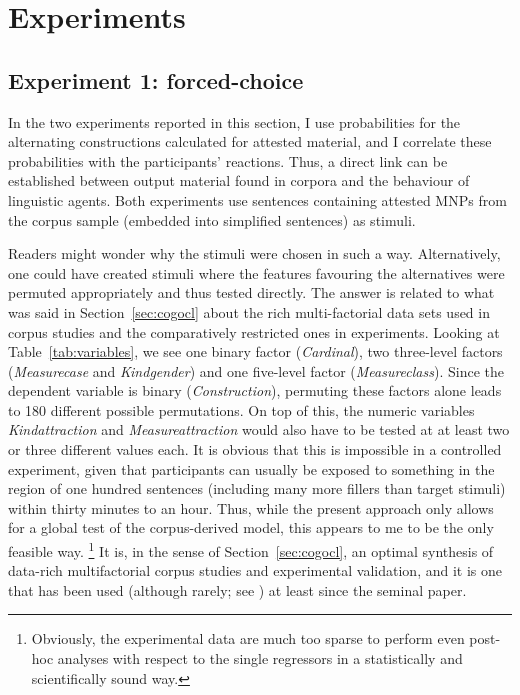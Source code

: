 \section{Experiments}
\label{sec:experimental}

\subsection{Experiment 1: forced-choice}
\label{sec:exp:fc}

In the two experiments reported in this section, I use probabilities for the alternating constructions calculated for attested material, and I correlate these probabilities with the participants' reactions.
Thus, a direct link can be established between output material found in corpora and the behaviour of linguistic agents.
Both experiments use sentences containing attested MNPs from the corpus sample (embedded into simplified sentences) as stimuli.

Readers might wonder why the stimuli were chosen in such a way.
Alternatively, one could have created stimuli where the features favouring the alternatives were permuted appropriately and thus tested directly.
The answer is related to what was said in Section~\ref{sec:cogocl} about the rich multi-factorial data sets used in corpus studies and the comparatively restricted ones in experiments.
Looking at Table~\ref{tab:variables}, we see one binary factor (\textit{Cardinal}), two three-level factors (\textit{Measurecase} and \textit{Kindgender}) and one five-level factor (\textit{Measureclass}).
Since the dependent variable is binary (\textit{Construction}), permuting these factors alone leads to 180 different possible permutations.
On top of this, the numeric variables \textit{Kindattraction} and \textit{Measureattraction} would also have to be tested at at least two or three different values each.
It is obvious that this is impossible in a controlled experiment, given that participants can usually be exposed to something in the region of one hundred sentences (including many more fillers than target stimuli) within thirty minutes to an hour.
Thus, while the present approach only allows for a global test of the corpus-derived model, this appears to me to be the only feasible way.%
\footnote{Obviously, the experimental data are much too sparse to perform even post-hoc analyses with respect to the single regressors in a statistically and scientifically sound way.}
It is, in the sense of Section~\ref{sec:cogocl}, an optimal synthesis of data-rich multifactorial corpus studies and experimental validation, and it is one that has been used (although rarely; see \citealp[3--4]{DivjakEa2016a}) at least since the seminal \citet{BresnanEa2007} paper.

